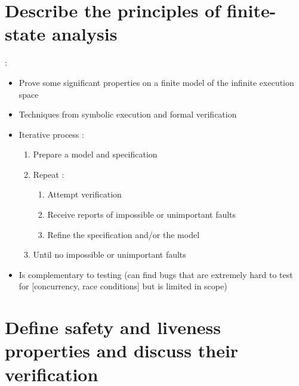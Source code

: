 \section{Describe the principles of finite-state analysis}

 :
\begin{itemize}
    \item Prove some significant properties on a finite model of the infinite execution space
    \item Techniques from symbolic execution and formal verification
    \item Iterative process :
    \begin{enumerate}
        \item Prepare a model and specification
        \item Repeat :
        \begin{enumerate}
            \item Attempt verification
            \item Receive reports of impossible or unimportant faults
            \item Refine the specification and/or the model
        \end{enumerate}
        \item Until no impossible or unimportant faults
    \end{enumerate}
    \item Is complementary to testing (can find bugs that are extremely hard to test for {[concurrency, race conditions]} but is limited in scope)
\end{itemize}

\section{Define safety and liveness properties and discuss their verification}

